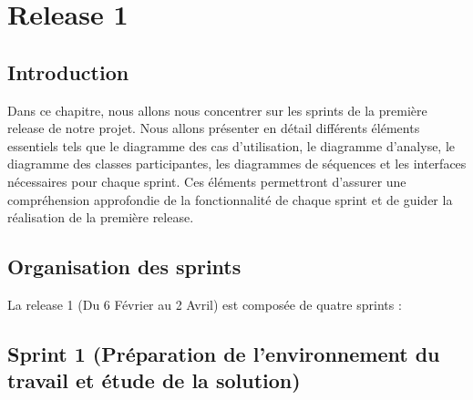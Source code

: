 \chapter*{Release 1}
\label{chap:release1}
\setcounter{part}{0}
\setcounter{chapter}{0}
\setcounter{section}{0}
\renewcommand{\thechapter}{\arabic{chapter}}
\renewcommand{\thepart}{\arabic{part}}
\renewcommand{\thesection}{\arabic{section}}
\section*{Introduction}
Dans ce chapitre, nous allons nous concentrer sur les sprints de la première release de notre projet. Nous allons présenter en détail différents éléments essentiels tels que le diagramme des cas d'utilisation, le diagramme d'analyse, le diagramme des classes participantes, les diagrammes de séquences et les interfaces nécessaires pour chaque sprint. Ces éléments permettront d'assurer une compréhension approfondie de la fonctionnalité de chaque sprint et de guider la réalisation de la première release.

\section{Organisation des sprints}
La release 1 (Du 6 Février au 2 Avril) est composée de quatre sprints : 




\section{Sprint 1 (Préparation de l'environnement du travail et étude de la solution)}

